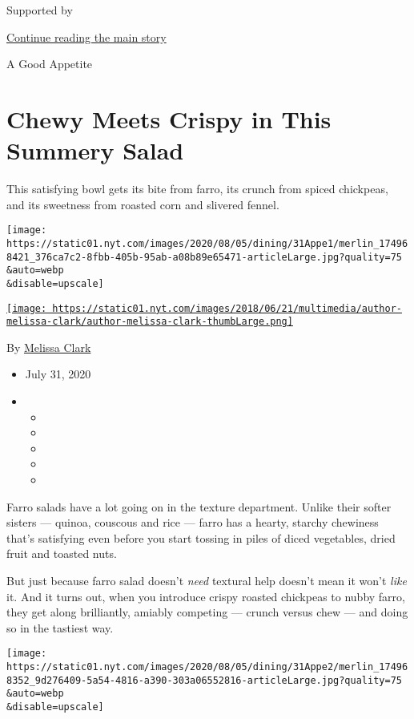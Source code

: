 Supported by

\protect\hyperlink{after-sponsor}{Continue reading the main story}

A Good Appetite

\hypertarget{chewy-meets-crispy-in-this-summery-salad}{%
\section{Chewy Meets Crispy in This Summery
Salad}\label{chewy-meets-crispy-in-this-summery-salad}}

This satisfying bowl gets its bite from farro, its crunch from spiced
chickpeas, and its sweetness from roasted corn and slivered fennel.

\texttt{[image: https://static01.nyt.com/images/2020/08/05/dining/31Appe1/merlin\_174968421\_376ca7c2-8fbb-405b-95ab-a08b89e65471-articleLarge.jpg?quality=75\\\&auto=webp\\\&disable=upscale]}

\href{https://www.nytimes.com/by/melissa-clark}{\texttt{[image: https://static01.nyt.com/images/2018/06/21/multimedia/author-melissa-clark/author-melissa-clark-thumbLarge.png]}}

By \href{https://www.nytimes.com/by/melissa-clark}{Melissa Clark}

\begin{itemize}
\item
  July 31, 2020
\item
  \begin{itemize}
  \item
  \item
  \item
  \item
  \item
  \end{itemize}
\end{itemize}

Farro salads have a lot going on in the texture department. Unlike their
softer sisters --- quinoa, couscous and rice --- farro has a hearty,
starchy chewiness that's satisfying even before you start tossing in
piles of diced vegetables, dried fruit and toasted nuts.

But just because farro salad doesn't \emph{need} textural help doesn't
mean it won't \emph{like} it. And it turns out, when you introduce
crispy roasted chickpeas to nubby farro, they get along brilliantly,
amiably competing --- crunch versus chew --- and doing so in the
tastiest way.

\texttt{[image: https://static01.nyt.com/images/2020/08/05/dining/31Appe2/merlin\_174968352\_9d276409-5a54-4816-a390-303a06552816-articleLarge.jpg?quality=75\\\&auto=webp\\\&disable=upscale]}


